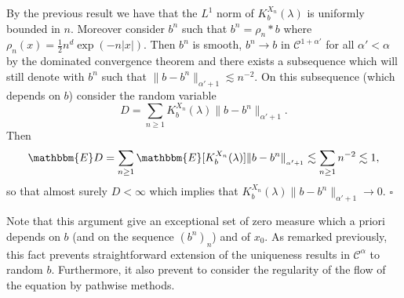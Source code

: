 \documentclass[a4paper,11pt]{article}
\newenvironment{proof}{{\sc Proof.}}{\hfill$\square$}
\newcommand{\CC}{\mathscr C}
\begin{document}
\begin{proof}
  By the previous result we have that the $L^{1}$ norm of $K_{b}^{X_{n}} (
  \lambda )$ is uniformly bounded in $n$. Moreover consider $b^{n}$ such that
  $b^{n} = \rho_{n} \ast b$ where $\rho_{n} (x) = \frac{1}{2} n^{d} \exp  (-n
  |x| )$. Then $b^{n}$ is smooth, $b^{n} \to b$ in $\CC^{1+ \alpha'}$ for all
  $\alpha' < \alpha$ by the dominated convergence theorem and there exists a
  subsequence which will still denote with $b^{n}$ such that $\| b-b^{n}
  \|_{\alpha' +1} \lesssim n^{-2}$. On this subsequence (which depends on $b$)
  consider the random variable
  \[ D= \sum_{n \ge 1} K_{b}^{X_{n}} ( \lambda ) \|b-b^{n} \|_{\alpha' +1}. \]
  Then
  \[ \mathbbm{E}D= \sum_{n \ge 1} \mathbbm{E} [ K_{b}^{X_{n}} ( \lambda ) ] 
     \|b-b^{n} \|_{_{\alpha' +1}} \lesssim \sum_{n \ge 1} n^{-2} \lesssim 1, \]
  so that almost surely $D< \infty$ which implies that $K_{b}^{X_{n}} (
  \lambda )  \|b-b^{n} \|_{\alpha' +1} \to 0$.
\end{proof}

Note that this argument give an exceptional set of zero measure which a priori
depends on $b$ (and on the sequence $(b^{n} )_{n}$) and of $x_{0}$. As
remarked previously, this fact prevents straightforward extension of the
uniqueness results in $\CC^{\alpha}$ to random $b$. Furthermore, it also
prevent to consider the regularity of the flow of the equation by pathwise
methods.
\end{document}
